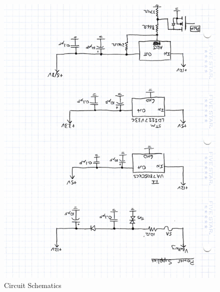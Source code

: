 \documentclass[12pt,letterpaper]{article}
\begin{document}
\begin{figure}[H]
\centering
\includegraphics[page=3, totalheight=20cm, angle=180]{images/circuit_sch.pdf}
\caption{Circuit Schematics}
\label{fig: image}
\end{figure}
\end{document}
